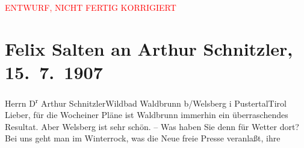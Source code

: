 
\begin{center}
            \textcolor{red}{ENTWURF, NICHT FERTIG KORRIGIERT}
                      \end{center}
            
         
         \renewcommand{\erwaehntePersonen}{Personen: Richard Beer-Hofmann, Alois Hofmann, Gustav Mahler, Maria Anna Mahler, Ottilie Salten, Michael Emil Salzmann}
         \renewcommand{\erwaehnteInstitutionen}{Institutionen: Neue Freie Presse}
         \renewcommand{\erwaehnteOrte}{Orte: Edlach, Südtirol, Welsberg-Taisten, Wien, Wildbad Waldbrunn, Wocheiner See, XIX., Döbling}
         \renewcommand{\erwaehnteWerke}{Werke: Kindertotenlieder}
               \section[Felix Salten an Arthur Schnitzler, 15. 7. 1907]{ Felix Salten an Arthur Schnitzler, 15. 7. 1907}\nopagebreak{}\rehead{ }\begin{ledgroupsized}[t]{13cm}\normalsize\beginnumbering \toendnotes[C]{\smallbreak\pagebreak[2]} 
\toendnotes[C]{\smallbreak}\pstart{}{\pb}Herrn D\textsuperscript{r} Arthur Schnitzler\pend{}\pstart{}Wildbad Waldbrunn b/Welsberg i Pustertal\pend{}\pstart{}Tirol\pend{}{\bigskip}\pstart
           \noindent{}{\pb}Lieber, für die Wocheiner
               Pläne ist Waldbrunn immerhin ein überraschendes
               Resultat. Aber Welsberg ist sehr schön. – Was
               haben Sie denn für Wetter dort? Bei uns geht man im Winterrock, was die Neue freie Presse veranlaßt, ihre

\end{ledgroupsized}
